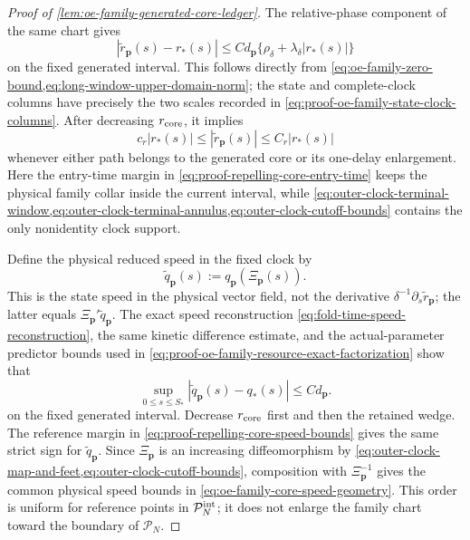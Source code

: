 \begin{proof}[Proof of
\cref{lem:oe-family-generated-core-ledger}]
The relative-phase component of the same chart gives
\begin{equation}
 |\widetilde r_{\mathbf p}(s)-r_*(s)|
 \le C d_{\mathbf p}
       \{\rho_\delta+\lambda_\delta|r_*(s)|\}               \label{eq:proof-oe-family-core-phase-comparison}
\end{equation}
on the fixed generated interval.  This follows directly from
\cref{eq:oe-family-zero-bound,eq:long-window-upper-domain-norm}; the
state and complete-clock columns have precisely the two scales recorded
in \cref{eq:proof-oe-family-state-clock-columns}.  After decreasing
\(r_{\rm core}\), it implies
\begin{equation}
 c_r|r_*(s)|\le|\widetilde r_{\mathbf p}(s)|
       \le C_r|r_*(s)|                         \label{eq:proof-oe-family-core-phase-comparability}
\end{equation}
whenever either path belongs to the generated core or its one-delay
enlargement.  Here the entry-time margin in
\cref{eq:proof-repelling-core-entry-time} keeps the physical family
collar inside the current interval, while
\cref{eq:outer-clock-terminal-window,eq:outer-clock-terminal-annulus,eq:outer-clock-cutoff-bounds}
contains the only nonidentity clock support.

Define the physical reduced speed in the fixed clock by
\[
 \widetilde q_{\mathbf p}(s)
 :=q_{\mathbf p}(\Xi_{\mathbf p}(s)).
\]
This is the state speed in the physical vector field, not the derivative
\(\delta^{-1}\partial_s\widetilde r_{\mathbf p}\); the latter equals
\(\Xi_{\mathbf p}'\widetilde q_{\mathbf p}\).  The exact speed
reconstruction \cref{eq:fold-time-speed-reconstruction}, the same kinetic
difference estimate, and the actual-parameter predictor bounds used in
\cref{eq:proof-oe-family-resource-exact-factorization} show that
\begin{equation}
 \sup_{0\le s\le S_*}
       |\widetilde q_{\mathbf p}(s)-q_*(s)|
 \le Cd_{\mathbf p}.                           \label{eq:proof-oe-family-core-speed-difference}
\end{equation}
on the fixed generated interval.  Decrease \(r_{\rm core}\) first and
then the retained wedge.  The reference margin in
\cref{eq:proof-repelling-core-speed-bounds} gives the same strict sign for
\(\widetilde q_{\mathbf p}\).  Since \(\Xi_{\mathbf p}\) is an increasing
diffeomorphism by
\cref{eq:outer-clock-map-and-feet,eq:outer-clock-cutoff-bounds}, composition
with \(\Xi_{\mathbf p}^{-1}\) gives the common physical speed bounds in
\cref{eq:oe-family-core-speed-geometry}.  This order is uniform for
reference points in \(\mathcal P_N^{\rm int}\); it does not enlarge the
family chart toward the boundary of \(\mathcal P_N\).


\end{proof}
